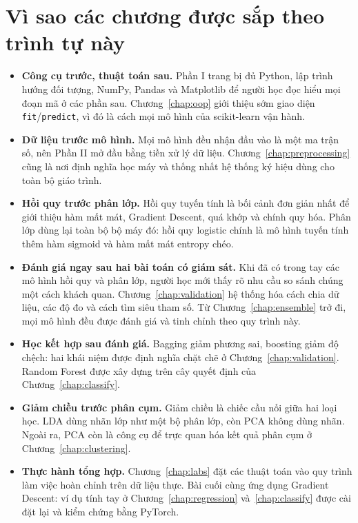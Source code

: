 \section*{Vì sao các chương được sắp theo trình tự này}

\begin{itemize}
    \item \textbf{Công cụ trước, thuật toán sau.} Phần I trang bị đủ Python, lập trình hướng đối tượng, NumPy, Pandas và Matplotlib để người học đọc hiểu mọi đoạn mã ở các phần sau. Chương~\ref{chap:oop} giới thiệu sớm giao diện \texttt{fit}/\texttt{predict}, vì đó là cách mọi mô hình của scikit-learn vận hành.
    \item \textbf{Dữ liệu trước mô hình.} Mọi mô hình đều nhận đầu vào là một ma trận số, nên Phần II mở đầu bằng tiền xử lý dữ liệu. Chương~\ref{chap:preprocessing} cũng là nơi định nghĩa học máy và thống nhất hệ thống ký hiệu dùng cho toàn bộ giáo trình.
    \item \textbf{Hồi quy trước phân lớp.} Hồi quy tuyến tính là bối cảnh đơn giản nhất để giới thiệu hàm mất mát, Gradient Descent, quá khớp và chính quy hóa. Phân lớp dùng lại toàn bộ bộ máy đó: hồi quy logistic chính là mô hình tuyến tính thêm hàm sigmoid và hàm mất mát entropy chéo.
    \item \textbf{Đánh giá ngay sau hai bài toán có giám sát.} Khi đã có trong tay các mô hình hồi quy và phân lớp, người học mới thấy rõ nhu cầu so sánh chúng một cách khách quan. Chương~\ref{chap:validation} hệ thống hóa cách chia dữ liệu, các độ đo và cách tìm siêu tham số. Từ Chương~\ref{chap:ensemble} trở đi, mọi mô hình đều được đánh giá và tinh chỉnh theo quy trình này.
    \item \textbf{Học kết hợp sau đánh giá.} Bagging giảm phương sai, boosting giảm độ chệch: hai khái niệm được định nghĩa chặt chẽ ở Chương~\ref{chap:validation}. Random Forest được xây dựng trên cây quyết định của Chương~\ref{chap:classify}.
    \item \textbf{Giảm chiều trước phân cụm.} Giảm chiều là chiếc cầu nối giữa hai loại học. LDA dùng nhãn lớp như một bộ phân lớp, còn PCA không dùng nhãn. Ngoài ra, PCA còn là công cụ để trực quan hóa kết quả phân cụm ở Chương~\ref{chap:clustering}.
    \item \textbf{Thực hành tổng hợp.} Chương~\ref{chap:labs} đặt các thuật toán vào quy trình làm việc hoàn chỉnh trên dữ liệu thực. Bài cuối cùng ứng dụng Gradient Descent: ví dụ tính tay ở Chương~\ref{chap:regression} và~\ref{chap:classify} được cài đặt lại và kiểm chứng bằng PyTorch.
\end{itemize}

